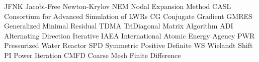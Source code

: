 \makeglossaries

    {JFNK}    {Jacobi-Free Newton-Krylov}
     {NEM}     {Nodal Expansion Method}
    {CASL}    {Consortium for Advanced Simulation of LWRs}
      {CG}      {Conjugate Gradient}
   {GMRES}   {Generalized Minimal Residual}
    {TDMA}    {TriDiagonal Matrix Algorithm}
     {ADI}     {Alternating Direction Iterative}
    {IAEA}    {International Atomic Energy Agency}
     {PWR}     {Pressurized Water Reactor}
     {SPD}     {Symmetric Positive Definite}
      {WS}      {Wielandt Shift}
      {PI}      {Power Iteration}
    {CMFD}    {Coarse Mesh Finite Difference}
